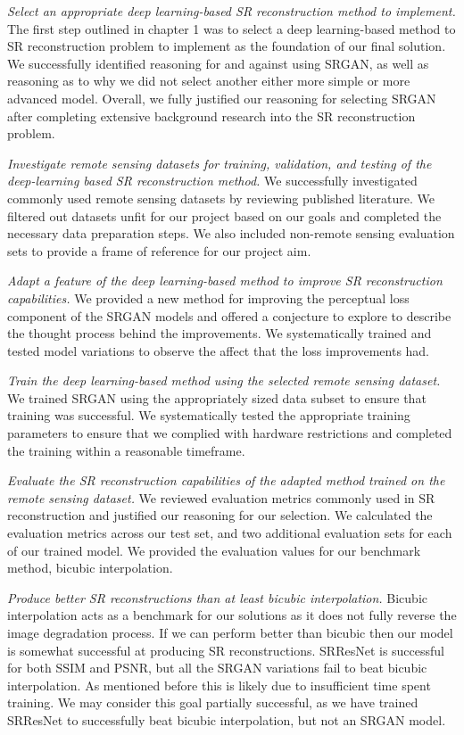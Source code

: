 \textit{Select an appropriate deep learning-based SR reconstruction method to implement.} The first step outlined in chapter 1 was to select a deep learning-based method to SR reconstruction problem to implement as the foundation of our final solution. We successfully identified reasoning for and against using SRGAN, as well as reasoning as to why we did not select another either more simple or more advanced model. Overall, we fully justified our reasoning for selecting SRGAN after completing extensive background research into the SR reconstruction problem.

\textit{Investigate remote sensing datasets for training, validation, and testing of the deep-learning based SR reconstruction method.} We successfully investigated commonly used remote sensing datasets by reviewing published literature. We filtered out datasets unfit for our project based on our goals and completed the necessary data preparation steps. We also included non-remote sensing evaluation sets to provide a frame of reference for our project aim. 

\textit{Adapt a feature of the deep learning-based method to improve SR reconstruction capabilities.} We provided a new method for improving the perceptual loss component of the SRGAN models and offered a conjecture to explore to describe the thought process behind the improvements. We systematically trained and tested model variations to observe the affect that the loss improvements had.

\textit{Train the deep learning-based method using the selected remote sensing dataset.} We trained SRGAN using the appropriately sized data subset to ensure that training was successful. We systematically tested the appropriate training parameters to ensure that we complied with hardware restrictions and completed the training within a reasonable timeframe.

\textit{Evaluate the SR reconstruction capabilities of the adapted method trained on the remote sensing dataset.} We reviewed evaluation metrics commonly used in SR reconstruction and justified our reasoning for our selection. We calculated the evaluation metrics across our test set, and two additional evaluation sets for each of our trained model. We provided the evaluation values for our benchmark method, bicubic interpolation.

\textit{Produce better SR reconstructions than at least bicubic interpolation.} Bicubic interpolation acts as a benchmark for our solutions as it does not fully reverse the image degradation process. If we can perform better than bicubic then our model is somewhat successful at producing SR reconstructions. SRResNet is successful for both SSIM and PSNR, but all the SRGAN variations fail to beat bicubic interpolation. As mentioned before this is likely due to insufficient time spent training. We may consider this goal partially successful, as we have trained SRResNet to successfully beat bicubic interpolation, but not an SRGAN model.

